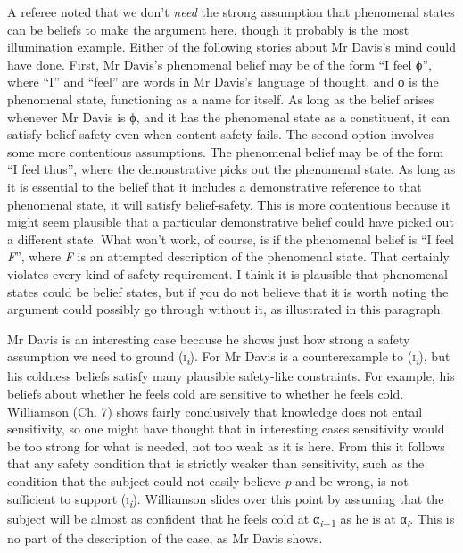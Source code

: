 \documentclass[
  11pt,
  letterpaper,
  DIV=11,
  numbers=noendperiod,
  twoside]{scrartcl}
\begin{document}
A referee noted that we don't \emph{need} the strong assumption that
phenomenal states can be beliefs to make the argument here, though it
probably is the most illumination example. Either of the following
stories about Mr Davis's mind could have done. First, Mr Davis's
phenomenal belief may be of the form ``I feel ϕ'', where ``I'' and
``feel'' are words in Mr Davis's language of thought, and ϕ is the
phenomenal state, functioning as a name for itself. As long as the
belief arises whenever Mr Davis is ϕ, and it has the phenomenal state as
a constituent, it can satisfy belief-safety even when content-safety
fails. The second option involves some more contentious assumptions. The
phenomenal belief may be of the form ``I feel thus'', where the
demonstrative picks out the phenomenal state. As long as it is essential
to the belief that it includes a demonstrative reference to that
phenomenal state, it will satisfy belief-safety. This is more
contentious because it might seem plausible that a particular
demonstrative belief could have picked out a different state. What won't
work, of course, is if the phenomenal belief is ``I feel \emph{F}'',
where \emph{F} is an attempted description of the phenomenal state. That
certainly violates every kind of safety requirement. I think it is
plausible that phenomenal states could be belief states, but if you do
not believe that it is worth noting the argument could possibly go
through without it, as illustrated in this paragraph.

Mr Davis is an interesting case because he shows just how strong a
safety assumption we need to ground
(\textsc{i}\textsubscript{\emph{i}}). For Mr Davis is a counterexample
to (\textsc{i}\textsubscript{\emph{i}}), but his coldness beliefs
satisfy many plausible safety-like constraints. For example, his beliefs
about whether he feels cold are sensitive to whether he feels cold.
Williamson (Ch. 7) shows fairly conclusively that knowledge does not
entail sensitivity, so one might have thought that in interesting cases
sensitivity would be too strong for what is needed, not too weak as it
is here. From this it follows that any safety condition that is strictly
weaker than sensitivity, such as the condition that the subject could
not easily believe \emph{p} and be wrong, is not sufficient to support
(\textsc{i}\textsubscript{\emph{i}}). Williamson slides over this point
by assuming that the subject will be almost as confident that he feels
cold at α\textsubscript{\emph{i}+1} as he is at
α\textsubscript{\emph{i}}. This is no part of the description of the
case, as Mr Davis shows.
\end{document}
